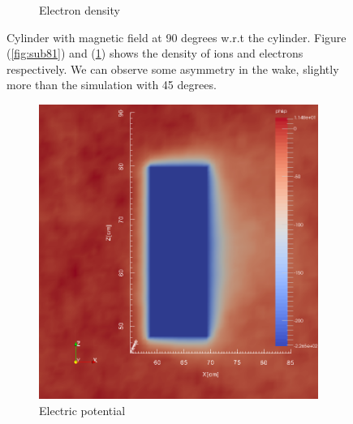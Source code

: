 \documentclass[twoside]{article}
\begin{document}
\begin{figure}[h]
\begin{subfigure}{.5\textwidth}
  \caption{Electron density}
  \label{fig:sub82}
\end{subfigure}
\caption{Cylinder with magnetic field at 90 degrees w.r.t the cylinder. Figure (\ref{fig:sub81}) and (\ref{fig:sub82}) shows the density of ions and electrons respectively. We can observe some asymmetry in the wake, slightly more than the simulation with 45 degrees.}
\label{fig:8}
\end{figure}

\begin{figure}[H]
\centering
\begin{subfigure}{.5\textwidth}
  \centering
  \includegraphics[width=\linewidth]{phis_2sim_oslo_B50.png}
  \caption{Electric potential}
  \label{fig:sub91}
\end{subfigure}%
\begin{subfigure}{.5\textwidth}
  \centering

\end{subfigure}
\end{figure}
\end{document}
